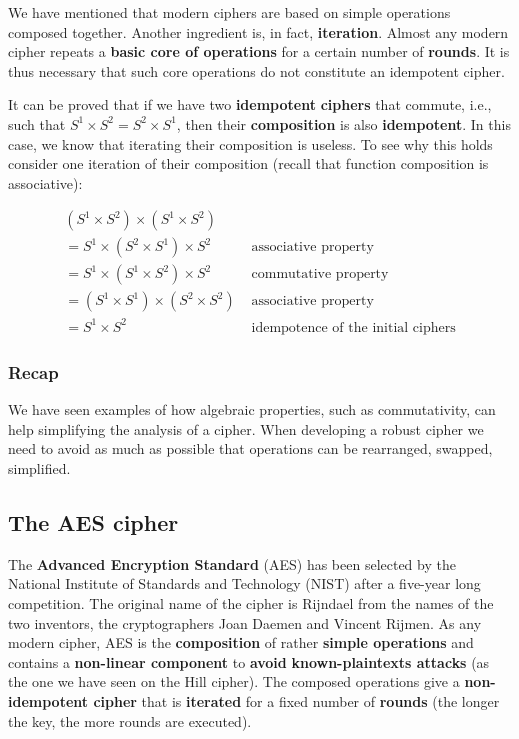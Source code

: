 We have mentioned that modern ciphers are based on simple operations composed together. Another ingredient is, in fact, \textbf{iteration}. Almost any modern cipher repeats a \textbf{basic core of operations} for a certain number of \textbf{rounds}. It is thus necessary that such core operations do not constitute an idempotent cipher.

It can be proved that if we have two \textbf{idempotent} \textbf{ciphers} that commute, i.e., such that $S^1 \times S^2 = S^2 \times S^1$, then their \textbf{composition} is also \textbf{idempotent}. In this case, we know that iterating their composition is useless. To see why this holds consider one iteration of their composition (recall that function composition is associative):

$$
\begin{array}{ll}(S^1 \times S^2) \times (S^1 \times S^2)\\ = S^1 \times (S^2 \times S^1) \times S^2 &\mbox{ associative property}\\ = S^1 \times (S^1 \times S^2) \times S^2 &\mbox{ commutative property}\\= (S^1 \times S^1) \times (S^2 \times S^2) &\mbox{ associative property}\\ = S^1 \times S^2 &\mbox{ idempotence of the initial ciphers} \end{array}
$$

\subsubsection{Recap}
We have seen examples of how algebraic properties, such as commutativity, can help simplifying the analysis of a cipher. When developing a robust cipher we need to avoid as much as possible that operations can be rearranged, swapped, simplified.

\subsection{The AES cipher}
The \textbf{Advanced Encryption Standard} (AES) has been selected by the National Institute of Standards and Technology (NIST) after a five-year long competition. The original name of the cipher is Rijndael from the names of the two inventors, the cryptographers Joan Daemen and Vincent Rijmen. As any modern cipher, AES is the \textbf{composition} of rather \textbf{simple operations} and contains a \textbf{non-linear component} to \textbf{avoid} \textbf{known-plaintexts attacks} (as the one we have seen on the Hill cipher). The composed operations give a \textbf{non-idempotent cipher} that is \textbf{iterated} for a fixed number of \textbf{rounds} (the longer the key, the more rounds are executed).

